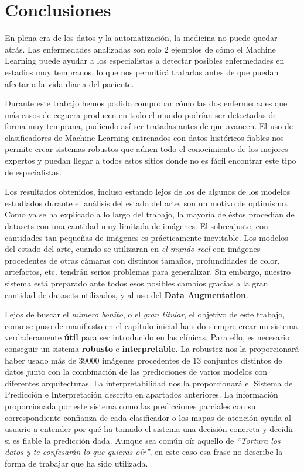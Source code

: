\documentclass[
  12pt,
  spanish,
  a4paperpaper,
]{report}
\begin{document}
\hypertarget{conclusiones}{%
\chapter{Conclusiones}\label{conclusiones}}

En plena era de los datos y la automatización, la medicina no puede
quedar atrás. Las enfermedades analizadas son solo 2 ejemplos de cómo el
Machine Learning puede ayudar a los especialistas a detectar posibles
enfermedades en estadios muy tempranos, lo que nos permitirá tratarlas
antes de que puedan afectar a la vida diaria del paciente.

Durante este trabajo hemos podido comprobar cómo las dos enfermedades
que más casos de ceguera producen en todo el mundo podrían ser
detectadas de forma muy temprana, pudiendo así ser tratadas antes de que
avancen. El uso de clasificadores de Machine Learning entrenados con
datos históricos fiables nos permite crear sistemas robustos que aúnen
todo el conocimiento de los mejores expertos y puedan llegar a todos
estos sitios donde no es fácil encontrar este tipo de especialistas.

Los resultados obtenidos, incluso estando lejos de los de algunos de los
modelos estudiados durante el análisis del estado del arte, son un
motivo de optimismo. Como ya se ha explicado a lo largo del trabajo, la
mayoría de éstos procedían de datasets con una cantidad muy limitada de
imágenes. El sobreajuste, con cantidades tan pequeñas de imágenes es
prácticamente inevitable. Los modelos del estado del arte, cuando se
utilizaran en \emph{el mundo real} con imágenes procedentes de otras
cámaras con distintos tamaños, profundidades de color, artefactos, etc.
tendrán serios problemas para generalizar. Sin embargo, nuestro sistema
está preparado ante todos esos posibles cambios gracias a la gran
cantidad de datasets utilizados, y al uso del \textbf{Data
Augmentation}.

Lejos de buscar el \emph{número bonito}, o el \emph{gran titular}, el
objetivo de este trabajo, como se puso de manifiesto en el capítulo
inicial ha sido siempre crear un sistema verdaderamente \textbf{útil}
para ser introducido en las clínicas. Para ello, es necesario conseguir
un sistema \textbf{robusto} e \textbf{interpretable}. La robustez nos la
proporcionará haber usado más de 39000 imágenes procedentes de 13
conjuntos distintos de datos junto con la combinación de las
predicciones de varios modelos con diferentes arquitecturas. La
interpretabilidad nos la proporcionará el Sistema de Predicción e
Interpretación descrito en apartados anteriores. La información
proporcionada por este sistema como las predicciones parciales con su
correspondiente confianza de cada clasificador o los mapas de atención
ayuda al usuario a entender por qué ha tomado el sistema una decisión
concreta y decidir si es fiable la predicción dada. Aunque sea común oír
aquello de \emph{``Tortura los datos y te confesarán lo que quieras
oír''}, en este caso esa frase no describe la forma de trabajar que ha
sido utilizada.
\end{document}
